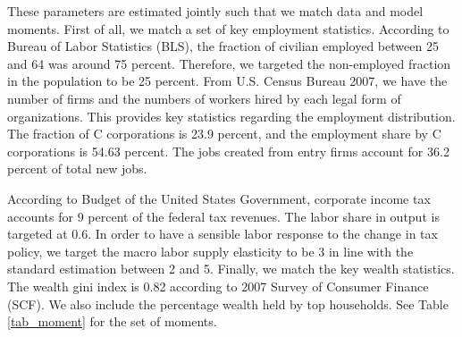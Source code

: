 \documentclass[12pt]{article}
\begin{document}
These parameters are estimated jointly such that we match data and
model moments. First of all, we match a set of key employment statistics. According to Bureau of Labor Statistics (BLS), the fraction of civilian employed between 25 and 64 was around 75 percent. Therefore, we targeted the non-employed fraction in the population to be 25 percent. From U.S. Census Bureau 2007, we have the number of firms and the numbers of workers hired by each legal form of organizations. This provides key statistics regarding the employment distribution. The fraction of C corporations is 23.9 percent, and the employment share by C corporations is 54.63 percent. The jobs created from entry firms account for 36.2 percent of total new jobs. 

According to Budget of the United States Government, corporate income tax accounts for 9 percent of the federal tax revenues. The labor share in output is targeted at 0.6. In order to have a sensible labor response to the change in tax policy, we target the macro labor supply elasticity to be 3 in line with the standard estimation between 2 and 5. Finally, we match the key wealth statistics. The wealth gini index is 0.82 according to 2007 Survey of Consumer Finance (SCF). We also include the percentage wealth held by top households. See Table \ref{tab_moment} for the set of moments. 
\end{document}
